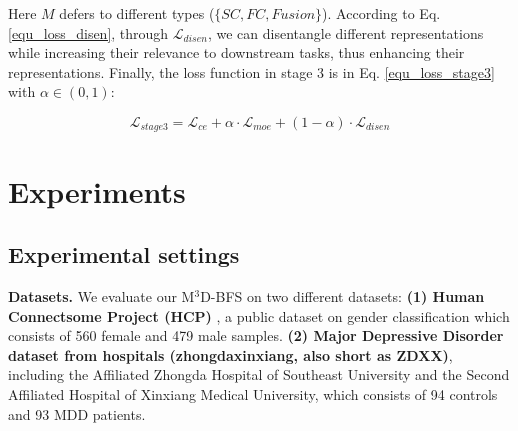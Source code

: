 \documentclass[10pt,twocolumn,letterpaper]{article}
\newcommand{\model}{M$^3$D-BFS }
\begin{document}
Here $M$ defers to different types ($\{SC, FC, Fusion\}$). According to Eq. \ref{equ_loss_disen}, through $\mathcal{L}_{disen}$, we can disentangle different representations while increasing their relevance to downstream tasks, thus enhancing their representations.
Finally, the loss function in stage 3 is in Eq. \ref{equ_loss_stage3} with $\alpha \in (0,1)$:

\begin{small}
\begin{equation}
    \mathcal{L}_{stage3} = \mathcal{L}_{ce} + \alpha \cdot \mathcal{L}_{moe} + (1-\alpha)\cdot \mathcal{L}_{disen}
    \label{equ_loss_stage3}
\end{equation}
\end{small}






% 

\section{Experiments}


\subsection{Experimental settings}
\textbf{Datasets.} We evaluate our \model on two different datasets: \textbf{(1) Human Connectsome Project (HCP)} \cite{HCP}, a public dataset on gender classification which consists of 560 female and 479 male samples. \textbf{(2) Major Depressive Disorder dataset from hospitals (zhongdaxinxiang, also short as ZDXX)}, including the Affiliated Zhongda Hospital of Southeast University and  the Second Affiliated Hospital of Xinxiang Medical University, which consists of 94 controls and 93 MDD patients.
\end{document}
